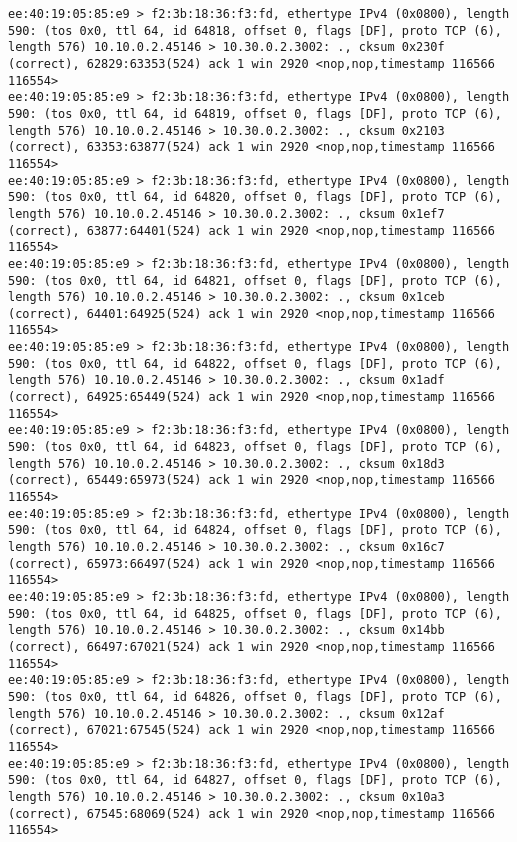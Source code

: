 \documentclass[a4paper,12pt]{article}
\begin{document}
\begin{Verbatim}
ee:40:19:05:85:e9 > f2:3b:18:36:f3:fd, ethertype IPv4 (0x0800), length 590: (tos 0x0, ttl 64, id 64818, offset 0, flags [DF], proto TCP (6), length 576) 10.10.0.2.45146 > 10.30.0.2.3002: ., cksum 0x230f (correct), 62829:63353(524) ack 1 win 2920 <nop,nop,timestamp 116566 116554>
ee:40:19:05:85:e9 > f2:3b:18:36:f3:fd, ethertype IPv4 (0x0800), length 590: (tos 0x0, ttl 64, id 64819, offset 0, flags [DF], proto TCP (6), length 576) 10.10.0.2.45146 > 10.30.0.2.3002: ., cksum 0x2103 (correct), 63353:63877(524) ack 1 win 2920 <nop,nop,timestamp 116566 116554>
ee:40:19:05:85:e9 > f2:3b:18:36:f3:fd, ethertype IPv4 (0x0800), length 590: (tos 0x0, ttl 64, id 64820, offset 0, flags [DF], proto TCP (6), length 576) 10.10.0.2.45146 > 10.30.0.2.3002: ., cksum 0x1ef7 (correct), 63877:64401(524) ack 1 win 2920 <nop,nop,timestamp 116566 116554>
ee:40:19:05:85:e9 > f2:3b:18:36:f3:fd, ethertype IPv4 (0x0800), length 590: (tos 0x0, ttl 64, id 64821, offset 0, flags [DF], proto TCP (6), length 576) 10.10.0.2.45146 > 10.30.0.2.3002: ., cksum 0x1ceb (correct), 64401:64925(524) ack 1 win 2920 <nop,nop,timestamp 116566 116554>
ee:40:19:05:85:e9 > f2:3b:18:36:f3:fd, ethertype IPv4 (0x0800), length 590: (tos 0x0, ttl 64, id 64822, offset 0, flags [DF], proto TCP (6), length 576) 10.10.0.2.45146 > 10.30.0.2.3002: ., cksum 0x1adf (correct), 64925:65449(524) ack 1 win 2920 <nop,nop,timestamp 116566 116554>
ee:40:19:05:85:e9 > f2:3b:18:36:f3:fd, ethertype IPv4 (0x0800), length 590: (tos 0x0, ttl 64, id 64823, offset 0, flags [DF], proto TCP (6), length 576) 10.10.0.2.45146 > 10.30.0.2.3002: ., cksum 0x18d3 (correct), 65449:65973(524) ack 1 win 2920 <nop,nop,timestamp 116566 116554>
ee:40:19:05:85:e9 > f2:3b:18:36:f3:fd, ethertype IPv4 (0x0800), length 590: (tos 0x0, ttl 64, id 64824, offset 0, flags [DF], proto TCP (6), length 576) 10.10.0.2.45146 > 10.30.0.2.3002: ., cksum 0x16c7 (correct), 65973:66497(524) ack 1 win 2920 <nop,nop,timestamp 116566 116554>
ee:40:19:05:85:e9 > f2:3b:18:36:f3:fd, ethertype IPv4 (0x0800), length 590: (tos 0x0, ttl 64, id 64825, offset 0, flags [DF], proto TCP (6), length 576) 10.10.0.2.45146 > 10.30.0.2.3002: ., cksum 0x14bb (correct), 66497:67021(524) ack 1 win 2920 <nop,nop,timestamp 116566 116554>
ee:40:19:05:85:e9 > f2:3b:18:36:f3:fd, ethertype IPv4 (0x0800), length 590: (tos 0x0, ttl 64, id 64826, offset 0, flags [DF], proto TCP (6), length 576) 10.10.0.2.45146 > 10.30.0.2.3002: ., cksum 0x12af (correct), 67021:67545(524) ack 1 win 2920 <nop,nop,timestamp 116566 116554>
ee:40:19:05:85:e9 > f2:3b:18:36:f3:fd, ethertype IPv4 (0x0800), length 590: (tos 0x0, ttl 64, id 64827, offset 0, flags [DF], proto TCP (6), length 576) 10.10.0.2.45146 > 10.30.0.2.3002: ., cksum 0x10a3 (correct), 67545:68069(524) ack 1 win 2920 <nop,nop,timestamp 116566 116554>

\end{Verbatim}
\end{document}

